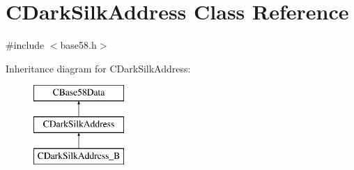 \hypertarget{class_c_dark_silk_address}{}\section{C\+Dark\+Silk\+Address Class Reference}
\label{class_c_dark_silk_address}


{\ttfamily \#include $<$base58.\+h$>$}

Inheritance diagram for C\+Dark\+Silk\+Address\+:\begin{figure}[H]
\begin{center}
\leavevmode
\includegraphics[height=3.000000cm]{class_c_dark_silk_address}
\end{center}
\end{figure}
